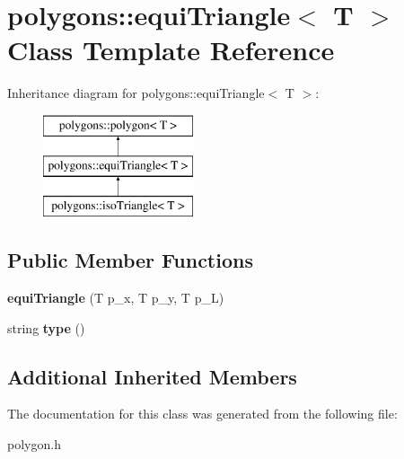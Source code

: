 \hypertarget{classpolygons_1_1equiTriangle}{\section{polygons\-:\-:equi\-Triangle$<$ T $>$ Class Template Reference}
\label{classpolygons_1_1equiTriangle}
}
Inheritance diagram for polygons\-:\-:equi\-Triangle$<$ T $>$\-:\begin{figure}[H]
\begin{center}
\leavevmode
\includegraphics[height=3.000000cm]{classpolygons_1_1equiTriangle}
\end{center}
\end{figure}
\subsection*{Public Member Functions}
\begin{DoxyCompactItemize}
\item 
\hypertarget{classpolygons_1_1equiTriangle_aa8d3b57db828513bc5ea9a9cf58b9672}{{\bfseries equi\-Triangle} (T p\-\_\-x, T p\-\_\-y, T p\-\_\-\-L)}\label{classpolygons_1_1equiTriangle_aa8d3b57db828513bc5ea9a9cf58b9672}

\item 
\hypertarget{classpolygons_1_1equiTriangle_a21f03ae2760d975fb2411355740abdaf}{string {\bfseries type} ()}\label{classpolygons_1_1equiTriangle_a21f03ae2760d975fb2411355740abdaf}

\end{DoxyCompactItemize}
\subsection*{Additional Inherited Members}


The documentation for this class was generated from the following file\-:\begin{DoxyCompactItemize}
\item 
polygon.\-h\end{DoxyCompactItemize}
